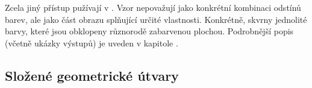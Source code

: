 \documentclass[a4paper,10pt]{article}
\begin{document}
Zcela jiný přístup pužívají v \cite{WanJiaZhoDu-ImProcBasFuzCelAuMod}. Vzor nepovažují jako konkrétní kombinaci odstínů barev, ale jako část obrazu splňující určité vlastnosti. Konkrétně, skvrny jednolité barvy, které jsou obklopeny různorodě zabarvenou plochou. Podrobnější popis (včetně ukázky výstupů) je uveden v kapitole .
% 
% 
% 
% 
% 
%  

\subsection{Složené geometrické útvary}
\end{document}
